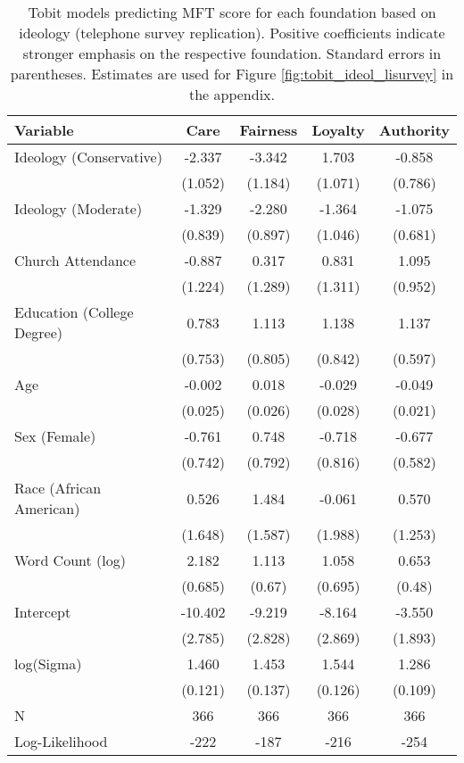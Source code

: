 \begin{table}[ht]
\centering
\caption{Tobit models predicting MFT score for each foundation based 
           on ideology (telephone survey replication). Positive coefficients indicate stronger emphasis on the respective 
           foundation. Standard errors in parentheses. Estimates are used for Figure 
           \ref{fig:tobit_ideol_lisurvey} in the appendix.} 
\label{tab:tobit_ideol_lisurvey}
\begingroup\footnotesize
\begin{tabular}{lcccc}
  \hline
Variable & Care & Fairness & Loyalty & Authority \\ 
  \hline
Ideology (Conservative) &  -2.337 & -3.342 &  1.703 & -0.858 \\ 
   & (1.052) & (1.184) & (1.071) & (0.786) \\ 
  Ideology (Moderate) &  -1.329 & -2.280 & -1.364 & -1.075 \\ 
   & (0.839) & (0.897) & (1.046) & (0.681) \\ 
  Church Attendance &  -0.887 &  0.317 &  0.831 &  1.095 \\ 
   & (1.224) & (1.289) & (1.311) & (0.952) \\ 
  Education (College Degree) &   0.783 &  1.113 &  1.138 &  1.137 \\ 
   & (0.753) & (0.805) & (0.842) & (0.597) \\ 
  Age &  -0.002 &  0.018 & -0.029 & -0.049 \\ 
   & (0.025) & (0.026) & (0.028) & (0.021) \\ 
  Sex (Female) &  -0.761 &  0.748 & -0.718 & -0.677 \\ 
   & (0.742) & (0.792) & (0.816) & (0.582) \\ 
  Race (African American) &   0.526 &  1.484 & -0.061 &  0.570 \\ 
   & (1.648) & (1.587) & (1.988) & (1.253) \\ 
  Word Count (log) &   2.182 &  1.113 &  1.058 &  0.653 \\ 
   & (0.685) & (0.67) & (0.695) & (0.48) \\ 
  Intercept & -10.402 & -9.219 & -8.164 & -3.550 \\ 
   & (2.785) & (2.828) & (2.869) & (1.893) \\ 
  log(Sigma) &   1.460 &  1.453 &  1.544 &  1.286 \\ 
   & (0.121) & (0.137) & (0.126) & (0.109) \\ 
   \hline
N & 366 & 366 & 366 & 366 \\ 
  Log-Likelihood & -222 & -187 & -216 & -254 \\ 
   \hline
\end{tabular}
\endgroup
\end{table}
